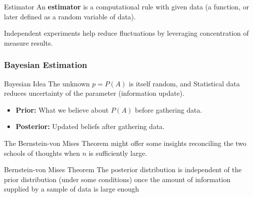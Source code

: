 \begin{df}{Estimator}
An \textbf{estimator} is a computational rule with given data (a function, or later defined as a random variable of data). 

	Independent experiments help reduce fluctuations by leveraging concentration of measure results.
\end{df}


\subsubsection{Bayesian Estimation}

\begin{thm}{Bayesian Idea}
The unknown \(p = P(A)\) is itself random, and Statistical data reduces uncertainty of the parameter (information update).
\begin{itemize}
\item \textbf{Prior:} What we believe about \(P(A)\) before gathering data.
\item \textbf{Posterior:} Updated beliefs after gathering data.
\end{itemize}
\end{thm}

The Bernstein-von Mises Theorem might offer some insights reconciling the two schools of thoughts when $n$ is sufficiently large. 

\begin{thm}{Bernstein-von Mises Theorem}
The posterior distribution is independent of the prior
distribution (under some conditions) once the amount of information supplied by a sample of data
is large enough
\end{thm}
